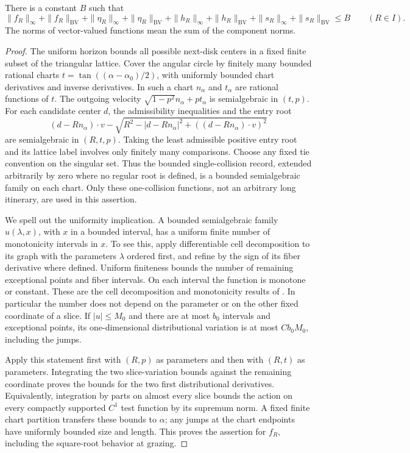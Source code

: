 \begin{lemma}\label{lem:physical-bv}
There is a constant $B$ such that
\[
 \|f_R\|_\infty+\|f_R\|_{\mathrm{BV}}
 +\|\eta_R\|_\infty+\|\eta_R\|_{\mathrm{BV}}
 +\|h_R\|_\infty+\|h_R\|_{\mathrm{BV}}
 +\|s_R\|_\infty+\|s_R\|_{\mathrm{BV}}\le B
 \qquad(R\in I).
\]
The norms of vector-valued functions mean the sum of the component norms.
\end{lemma}
\begin{proof}
The uniform horizon bounds all possible next-disk centers in a fixed
finite subset of the triangular lattice. Cover the angular circle by
finitely many bounded rational charts
$t=\tan((\alpha-\alpha_0)/2)$, with uniformly bounded chart derivatives
and inverse derivatives. In such a chart $n_\alpha$ and $t_\alpha$ are
rational functions of $t$. The outgoing velocity
$\sqrt{1-p^2}n_\alpha+pt_\alpha$ is semialgebraic in $(t,p)$. For each
candidate center $d$, the admissibility inequalities and the entry root
\[
 (d-Rn_\alpha)\cdot v
 -\sqrt{R^2-|d-Rn_\alpha|^2+((d-Rn_\alpha)\cdot v)^2}
\]
are semialgebraic in $(R,t,p)$. Taking the least admissible positive
entry root and its lattice label involves only finitely many comparisons.
Choose any fixed tie convention on the singular set. Thus the bounded
single-collision record, extended arbitrarily by zero where no regular
root is defined, is a bounded semialgebraic family on each chart.
Only these one-collision functions, not an arbitrary long itinerary,
are used in this assertion.

We spell out the uniformity implication. A bounded semialgebraic family
$u(\lambda,x)$, with $x$ in a bounded interval, has a uniform finite
number of monotonicity intervals in $x$. To see this, apply differentiable
cell decomposition to its graph with the parameters $\lambda$ ordered
first, and refine by the sign of its fiber derivative where defined.
Uniform finiteness bounds the number of remaining exceptional points
and fiber intervals. On each interval the function is monotone or
constant. These are the cell decomposition and monotonicity results of
\cite[Sections 2.1--2.2 and 6.2]{Coste}. In particular the number does
not depend on the parameter or on the other fixed coordinate of a slice.
If $|u|\le M_0$ and there are at most $b_0$ intervals and exceptional
points, its one-dimensional distributional variation is at most
$C b_0 M_0$, including the jumps.

Apply this statement first with $(R,p)$ as parameters and then with
$(R,t)$ as parameters. Integrating the two slice-variation bounds
against the remaining coordinate proves the bounds for the two
first distributional derivatives. Equivalently, integration by parts
on almost every slice bounds the action on every compactly supported
$C^1$ test function by its supremum norm. A fixed finite chart partition
transfers these bounds to $\alpha$; any jumps at the chart endpoints
have uniformly bounded size and length. This proves the assertion for
$f_R$, including the square-root behavior at grazing.


\end{proof}
